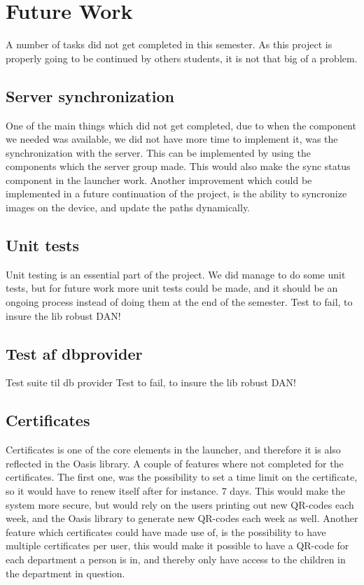 \section{Future Work}

A number of tasks did not get completed in this semester. As this project is properly going to be continued by others students, it is not that big of a problem. 

\subsection{Server synchronization}
One of the main things which did not get completed, due to when the component we needed was available, we did not have more time to implement it, was the synchronization with the server. This can be implemented by using the components which the server group made. This would also make the sync status component in the launcher work.
Another improvement which could be implemented in a future continuation of the project, is the ability to syncronize images on the device, and update the paths dynamically.

\subsection{Unit tests}
Unit testing is an essential part of the project. We did manage to do some unit tests, but for future work more unit tests could be made, and it should be an ongoing process instead of doing them at the end of the semester.
Test to fail, to insure the lib robust DAN!

\subsection{Test af dbprovider}
Test suite til db provider
Test to fail, to insure the lib robust DAN!

\subsection{Certificates}
Certificates is one of the core elements in the launcher, and therefore it is also reflected in the Oasis library. A couple of features where not completed for the certificates. The first one, was the possibility to set a time limit on the certificate, so it would have to renew itself after for instance. 7 days. This would make the system more secure, but would rely on the users printing out new QR-codes each week, and the Oasis library to generate new QR-codes each week as well.
Another feature which certificates could have made use of, is the possibility to have multiple certificates per user, this would make it possible to have a QR-code for each department a person is in, and thereby only have access to the children in the department in question.

